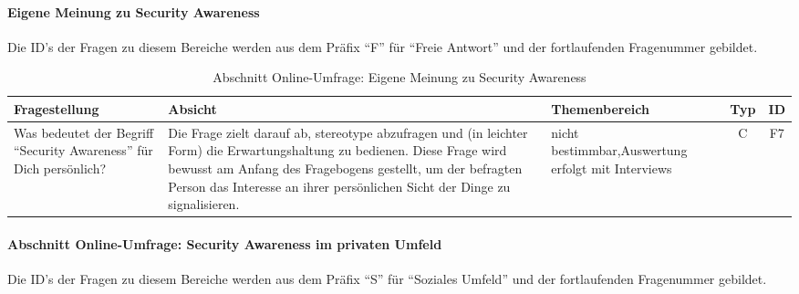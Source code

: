 \documentclass[../../main.tex]{subfiles}
\begin{document}
\paragraph*{Eigene Meinung zu Security Awareness}\mbox{}

\begin{sloppypar}
Die ID's der Fragen zu diesem Bereiche werden aus dem Präfix "`F"' für "`Freie Antwort"' und der fortlaufenden Fragenummer gebildet.
\end{sloppypar}


\sloppy 

\begin{table}[H]
\tablefontsize	
\centering
\caption{Abschnitt Online-Umfrage: Eigene Meinung zu Security Awareness}
\label{Eigene Meinung zu Security Awareness}
\begin{tabular}{ |p{5.5cm}|p{5.5cm}|p{2.5cm}|c|c|}

\hline
\tableheaderbgcolor
\textbf{Fragestellung} & \textbf{Absicht} & \textbf{Themenbereich} & \textbf{Typ} & \textbf{ID}\\ 
\hline
Was bedeutet der Begriff "`Security Awareness"' für Dich persönlich? &  Die Frage zielt darauf ab, stereotype abzufragen und (in leichter Form) die Erwartungshaltung zu bedienen. Diese Frage wird bewusst am Anfang des Fragebogens gestellt, um der befragten Person das Interesse an ihrer persönlichen Sicht der Dinge zu signalisieren. & nicht bestimmbar,\newline Auswertung erfolgt mit Interviews & C & F7 \\
\hline

\end{tabular}
\end{table}



\paragraph*{Abschnitt Online-Umfrage: Security Awareness im privaten Umfeld}\mbox{}

\begin{sloppypar}
Die ID's der Fragen zu diesem Bereiche werden aus dem Präfix "`S"' für "`Soziales Umfeld"' und der fortlaufenden Fragenummer gebildet.
\end{sloppypar}

\end{document}
